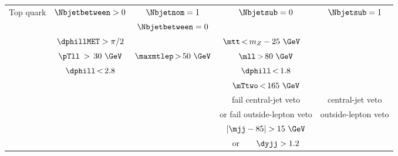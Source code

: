 \begin{tabular}{c|| c | c | c | c}
    \hline\hline
    \multirow{10}{*}{Top quark}   & \multirow{2}{*}{$\Nbjetbetween>0$}                   & $\Nbjetnom = 1$                                               & \multirow{2}{*}{$\Nbjetsub=0$} & \multirow{2}{*}{$\Nbjetsub=1$} \\
                                        &                                                      & $\Nbjetbetween  = 0$                                          &                                &                                \\ \cline{3-5}
                                        & $\dphillMET > \pi/2$                                 & \multicolumn{3}{c}{\phantom{ccccc}$\mtt\,{<}\,m_Z - 25~\GeV$}                                                                   \\ \cline{3-5}
                                        & $\pTll\, > \, 30~\GeV$                               & $\maxmtlep\,{>}\,50~\GeV$                                     & $\mll\,{>}\,80~\GeV$           &                                \\
                                        & $\dphill\,{<}\,2.8$                                  &                                                               & $\dphill\,{<}\,1.8$            &                                \\
                                        &                                                      &                                                               & $\mTtwo\,{<}\,165~\GeV$        &                                \\ \cline{4-4}
                                        &                                                      &                                                               & fail central-jet veto          & central-jet veto               \\
                                        &                                                      &                                                               & or fail outside-lepton veto    & outside-lepton veto            \\ \cline{4-4}
                                        &                                                      &                                                               & $|\mjj-85| > 15~\GeV$          &                                \\
                                        &                                                      &                                                               & or\ \ \ \ $\dyjj > 1.2$        &                                \\

\end{tabular}
